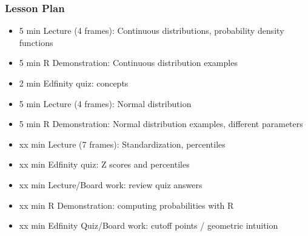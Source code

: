 \begin{frame}
    \frametitle{Lesson Plan}
    \begin{itemize}
        \item 5 min Lecture (4 frames): Continuous distributions, probability density functions
        \item 5 min R Demonstration: Continuous distribution examples
        \item 2 min Edfinity quiz: concepts

        \item 5 min Lecture (4 frames): Normal distribution
        \item 5 min R Demonstration: Normal distribution examples, different parameters
        \item xx min Lecture (7 frames): Standardization, percentiles
        \item xx min Edfinity quiz: Z scores and percentiles
        \item xx min Lecture/Board work: review quiz answers
        \item xx min R Demonstration: computing probabilities with R
        \item xx min Edfinity Quiz/Board work: cutoff points / geometric intuition
    \end{itemize}
\end{frame}



